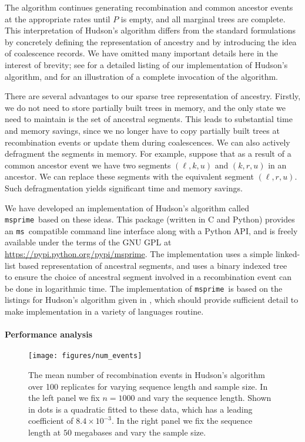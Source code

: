 \documentclass[10pt,letterpaper]{article}
\newcommand{\ms}[0]{\texttt{ms}}
\newcommand{\msprime}[0]{\texttt{msprime}}
\begin{document}
The algorithm continues generating recombination and common ancestor
events at the appropriate rates until $P$ is empty, and all marginal trees are
complete. This interpretation of Hudson's algorithm differs from the standard
formulations~\citep{h83b,h90,mc05} by concretely defining the representation of
ancestry and by introducing the idea of coalescence records. We have omitted
many important details here in the interest of brevity; see
 for a detailed listing of our
implementation of Hudson's algorithm, and
 for an illustration of a complete
invocation of the algorithm.

There are several advantages to our sparse tree representation of ancestry.
Firstly, we do not need to store partially built trees in memory, and the only
state we need to maintain is the set of ancestral segments. This leads to
substantial time and memory savings, since we no longer have to copy partially
built trees at recombination events or update them during coalescences. We can
also actively defragment the segments in memory. For example, suppose that as a
result of a common ancestor event we have two segments $(\ell, k, u)$ and $(k,
r, u)$ in an ancestor. We can replace these segments with the equivalent
segment $(\ell, r, u)$. Such defragmentation yields significant time and memory
savings.

We have developed an implementation of Hudson's algorithm called \msprime\
based on these ideas.  This package (written in C and Python) provides an \ms\
compatible command line interface along with a Python API, and is freely
available under the terms of the GNU GPL at
\url{https://pypi.python.org/pypi/msprime}. The implementation uses a simple
linked-list based representation of ancestral segments, and uses a binary
indexed tree~\citep{f94,f95} to ensure the choice of ancestral segment involved
in a recombination event can be done in logarithmic time.  The implementation
of \msprime\ is based on the listings for Hudson's algorithm given in
\nameref{app-algorithm-listing}, which should provide sufficient detail to make
implementation in a variety of languages routine.

\paragraph*{Performance analysis}
\label{sec-simulation-performance}

\begin{figure}
    \begin{center}
        \texttt{[image: figures/num\_events]}
    \end{center}
    \caption{\label{fig-algorithm-complexity} The mean number of
        recombination events in Hudson's algorithm over 100 replicates
        for varying sequence length and sample size. In the left panel we fix
        $n = 1000$ and vary the sequence length. Shown in dots is
        a quadratic fitted to these data, which has a
        leading coefficient of $8.4 \times 10^{-3}$.
        In the right panel
        we fix the sequence length at $50$ megabases and vary the sample
        size. }
\end{figure}
\end{document}
